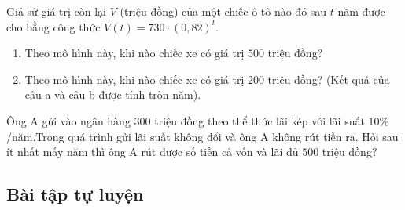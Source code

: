 \begin{vd}%
	Giả sử giá trị còn lại $V$ (triệu đồng) của một chiếc ô tô nào đó sau $t$ năm được cho bằng công thức $V(t)=730 \cdot(0,82)^t$.
	\begin{enumerate}
		\item Theo mô hình này, khi nào chiếc xe có giá trị $500$ triệu đồng?
		\item Theo mô hình này, khi nào chiếc xe có giá trị $200$ triệu đồng?
		(Kết quả của câu a và câu b được tính tròn năm).
	\end{enumerate}
\end{vd} 

\begin{vd}
	Ông A gửi vào ngân hàng $300$ triệu đồng theo thể thức lãi kép với lãi suất $10\%$/năm.Trong quá trình gửi lãi suất không đổi và ông A không rút tiền ra. Hỏi sau ít nhất mấy năm thì ông	A rút được số tiền cả vốn và lãi đủ $500$ triệu đồng?
\end{vd} 

\subsection{Bài tập tự luyện}

